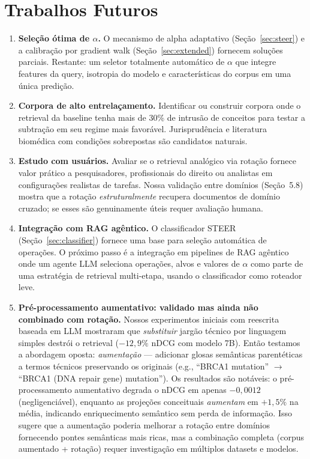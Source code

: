 \documentclass{article}
\begin{document}
\section{Trabalhos Futuros}

\begin{enumerate}
\item \textbf{Seleção ótima de $\alpha$.} O mecanismo de alpha adaptativo (Seção~\ref{sec:steer}) e a calibração por gradient walk (Seção~\ref{sec:extended}) fornecem soluções parciais. Restante: um seletor totalmente automático de $\alpha$ que integre features da query, isotropia do modelo e características do corpus em uma única predição.

\item \textbf{Corpora de alto entrelaçamento.} Identificar ou construir corpora onde o retrieval da baseline tenha mais de 30\% de intrusão de conceitos para testar a subtração em seu regime mais favorável. Jurisprudência e literatura biomédica com condições sobrepostas são candidatos naturais.

\item \textbf{Estudo com usuários.} Avaliar se o retrieval analógico via rotação fornece valor prático a pesquisadores, profissionais do direito ou analistas em configurações realistas de tarefas. Nossa validação entre domínios (Seção~5.8) mostra que a rotação \emph{estruturalmente} recupera documentos de domínio cruzado; se esses são genuinamente úteis requer avaliação humana.

\item \textbf{Integração com RAG agêntico.} O classificador STEER (Seção~\ref{sec:classifier}) fornece uma base para seleção automática de operações. O próximo passo é a integração em pipelines de RAG agêntico onde um agente LLM seleciona operações, alvos e valores de $\alpha$ como parte de uma estratégia de retrieval multi-etapa, usando o classificador como roteador leve.

\item \textbf{Pré-processamento aumentativo: validado mas ainda não combinado com rotação.} Nossos experimentos iniciais com reescrita baseada em LLM mostraram que \emph{substituir} jargão técnico por linguagem simples destrói o retrieval ($-12{,}9\%$ nDCG com modelo 7B). Então testamos a abordagem oposta: \emph{aumentação} --- adicionar glosas semânticas parentéticas a termos técnicos preservando os originais (e.g., ``BRCA1 mutation'' $\to$ ``BRCA1 (DNA repair gene) mutation''). Os resultados são notáveis: o pré-processamento aumentativo degrada o nDCG em apenas $-0{,}0012$ (negligenciável), enquanto as projeções conceituais \emph{aumentam} em $+1{,}5\%$ na média, indicando enriquecimento semântico sem perda de informação. Isso sugere que a aumentação poderia melhorar a rotação entre domínios fornecendo pontes semânticas mais ricas, mas a combinação completa (corpus aumentado + rotação) requer investigação em múltiplos datasets e modelos.


\end{enumerate}
\end{document}
